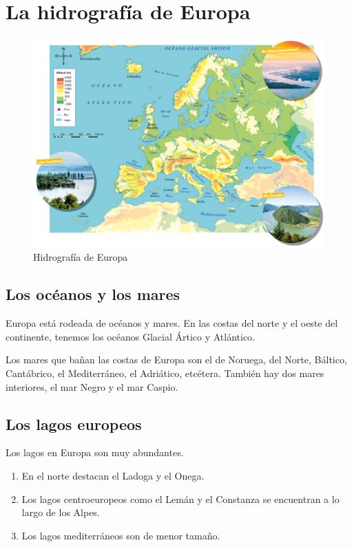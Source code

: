 \section{La hidrografía de Europa}

\begin{figure}[!ht]
    \centering
    \includegraphics[width=1\linewidth]{Tema2/10_Rios_Europa.png}
    \caption{Hidrografía de Europa}
    \label{fig:hidrografia-europa}
\end{figure}

\subsection{Los océanos y los mares}

Europa está rodeada de océanos y mares. En las costas del norte y el oeste del continente, tenemos los océanos Glacial Ártico y Atlántico.

\vspace{3mm}
Los mares que bañan las costas de Europa son el de Noruega, del Norte, Báltico, Cantábrico, el Mediterráneo, el Adriático, etcétera. También hay dos mares interiores, el mar Negro y el mar Caspio.

\subsection{Los lagos europeos}

Los lagos en Europa son muy abundantes.

\begin{enumerate}
    \item En el norte destacan el Ladoga y el Onega.
    \item Los lagos centroeuropeos como el Lemán y el Constanza se encuentran a lo largo de los Alpes.
    \item Los lagos mediterráneos son de menor tamaño.
\end{enumerate}


